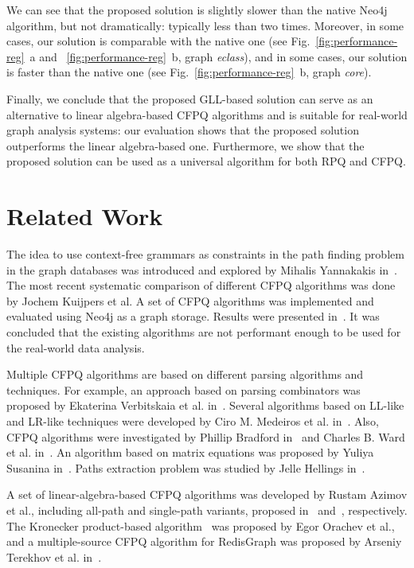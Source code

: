 \documentclass[
11pt,%
tightenlines,%
twoside,%
onecolumn,%
nobibnotes,%
nofootinbib,%
superscriptaddress,%
noshowpacs,%
longbibliography,%
centertags]%
{revtex4-2}
\begin{document}
We can see that the proposed solution is slightly slower than the native Neo4j algorithm, but not dramatically: typically less than two times. Moreover, in some cases, our solution is comparable with the native one (see Fig.~\ref{fig:performance-reg}~a and ~\ref{fig:performance-reg}~b, graph \textit{eclass}), and in some cases, our solution is faster than the native one (see Fig.~\ref{fig:performance-reg}~b, graph \textit{core}).

Finally, we conclude that the proposed GLL-based solution can serve as an alternative to linear algebra-based CFPQ algorithms and is suitable for real-world graph analysis systems: our evaluation shows that the proposed solution outperforms the linear algebra-based one. Furthermore, we show that the proposed solution can be used as a universal algorithm for both RPQ and CFPQ.


\section{Related Work}\label{section:related_work}

The idea to use context-free grammars as constraints in the path finding problem in the graph databases was introduced and explored by Mihalis Yannakakis in~\cite{10.1145/298514.298576}. The most recent systematic comparison of different CFPQ algorithms was done by Jochem Kuijpers et al. A set of CFPQ algorithms was implemented and evaluated using Neo4j as a graph storage. Results were presented in~\cite{Kuijpers:2019:ESC:3335783.3335791}. It was concluded that the existing algorithms are not performant enough to be used for the real-world data analysis.

Multiple CFPQ algorithms are based on different parsing algorithms and techniques. For example, an approach based on parsing combinators was proposed by Ekaterina Verbitskaia et al. in~\cite{10.1145/3241653.3241655}. Several algorithms based on LL-like and LR-like techniques were developed by Ciro M. Medeiros et al. in~\cite{10.1145/3427081.3427087,MEDEIROS201975,MEDEIROS2022101089}. Also, CFPQ algorithms were investigated by Phillip Bradford in~\cite{Bradford2009,8249039} and Charles B. Ward et al. in~\cite{4625871}. An algorithm based on matrix equations was proposed by Yuliya Susanina in~\cite{10.1145/3318464.3384400}.
Paths extraction problem was studied by Jelle Hellings in~\cite{Hellings2020ExplainingPQ}.

A set of linear-algebra-based CFPQ algorithms was developed by Rustam Azimov et al., including all-path and single-path variants, proposed in~\cite{10.1145/3461837.3464513} and~\cite{10.1145/3398682.3399163}, respectively. The Kronecker product-based algorithm~\cite{OrachevKronecker} was proposed by Egor Orachev et al., and a multiple-source CFPQ algorithm for RedisGraph was proposed by Arseniy Terekhov et al. in~\cite{DBLP:conf/edbt/TerekhovPAZG21}. 
\end{document}

